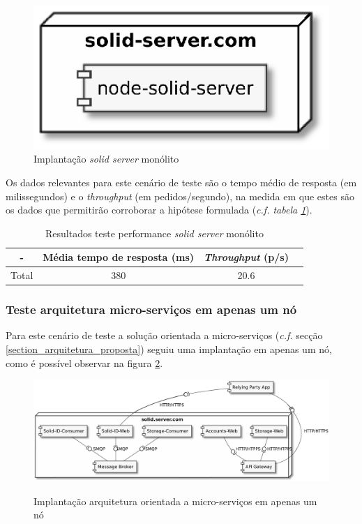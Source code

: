 \begin{figure}[H]
    \begin{center}
    \includegraphics[width=0.3 \textwidth]{figures/monolith_tests.eps}
    \caption{Implantação \emph{solid server} monólito}
    \label{monolith_tests_implantation_diagram}
    \end{center}
\end{figure}

\begin{table}[h]
\centering

Os dados relevantes para este cenário de teste são o tempo médio de resposta (em milissegundos) e o \emph{throughput} (em pedidos/segundo), na medida em que estes são os dados que permitirão corroborar a hipótese formulada (\emph{c.f. tabela \ref{table_resultados_testes_performance_monolith}}).

\caption{Resultados teste performance \emph{solid server} monólito}
\vspace{0.5cm}
\label{table_resultados_testes_performance_monolith}
\begin{tabular}{c|c|c|c}
 - & Média tempo de resposta (ms) & \emph{Throughput} (p/s) \\
\hline                          
Total & 380 & 20.6 \\
\end{tabular}
\end{table}

\subsubsection{Teste arquitetura micro-serviços em apenas um nó \label{tests_micro_services_1}}

Para este cenário de teste a solução orientada a micro-serviços (\emph{c.f.} secção  \ref{section_arquitetura_proposta}) seguiu uma implantação em apenas um nó, como é possível observar na figura \ref{figure_micro_services_tests_1_implantation_diagram}.

\begin{figure}[H]
    \begin{center}
    \label{figure_micro_services_tests_1_implantation_diagram}
    \includegraphics[width=1 \textwidth]{figures/microservices_tests1.eps}
    \caption{Implantação arquitetura orientada a micro-serviços em apenas um nó}
    \end{center}
\end{figure}


